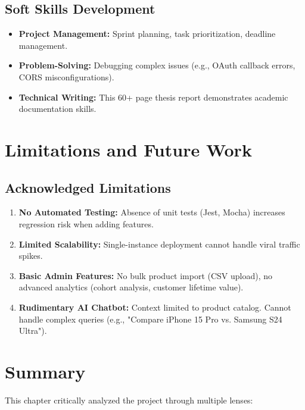 \documentclass[12pt, a4paper]{report}
\begin{document}
\subsection{Soft Skills Development}

\begin{itemize}
    \item \textbf{Project Management:} Sprint planning, task prioritization, deadline management.
    \item \textbf{Problem-Solving:} Debugging complex issues (e.g., OAuth callback errors, CORS misconfigurations).
    \item \textbf{Technical Writing:} This 60+ page thesis report demonstrates academic documentation skills.
\end{itemize}

\section{Limitations and Future Work}

\subsection{Acknowledged Limitations}

\begin{enumerate}
    \item \textbf{No Automated Testing:} Absence of unit tests (Jest, Mocha) increases regression risk when adding features.
    \item \textbf{Limited Scalability:} Single-instance deployment cannot handle viral traffic spikes.
    \item \textbf{Basic Admin Features:} No bulk product import (CSV upload), no advanced analytics (cohort analysis, customer lifetime value).
    \item \textbf{Rudimentary AI Chatbot:} Context limited to product catalog. Cannot handle complex queries (e.g., "Compare iPhone 15 Pro vs. Samsung S24 Ultra").
\end{enumerate}



\section{Summary}

This chapter critically analyzed the project through multiple lenses:
\end{document}
